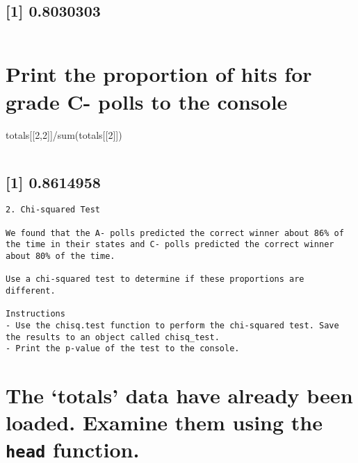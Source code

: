 \documentclass[
]{article}
\begin{document}
\begin{verbatim}
\end{verbatim}

\hypertarget{section-4}{%
\subsection{{[}1{]} 0.8030303}\label{section-4}}

\begin{verbatim}
\end{verbatim}

\hypertarget{print-the-proportion-of-hits-for-grade-c--polls-to-the-console}{%
\section{Print the proportion of hits for grade C- polls to the
console}\label{print-the-proportion-of-hits-for-grade-c--polls-to-the-console}}

totals{[}{[}2,2{]}{]}/sum(totals{[}{[}2{]}{]})

\begin{verbatim}
\end{verbatim}

\hypertarget{section-5}{%
\subsection{{[}1{]} 0.8614958}\label{section-5}}

\begin{verbatim}
2. Chi-squared Test

We found that the A- polls predicted the correct winner about 86% of the time in their states and C- polls predicted the correct winner about 80% of the time.

Use a chi-squared test to determine if these proportions are different.

Instructions
- Use the chisq.test function to perform the chi-squared test. Save the results to an object called chisq_test.
- Print the p-value of the test to the console.
\end{verbatim}

\hypertarget{the-totals-data-have-already-been-loaded.-examine-them-using-the-head-function.}{%
\section{\texorpdfstring{The `totals' data have already been loaded.
Examine them using the \texttt{head}
function.}{The `totals' data have already been loaded. Examine them using the head function.}}\label{the-totals-data-have-already-been-loaded.-examine-them-using-the-head-function.}}
\end{document}
